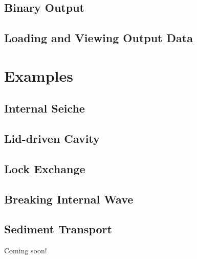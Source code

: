 \documentclass[12pt]{report}
\begin{document}
\section{Binary Output}

\section{Loading and Viewing Output Data}

\chapter{Examples}

\section{Internal Seiche}

\section{Lid-driven Cavity}

\section{Lock Exchange}

\section{Breaking Internal Wave}

\section{Sediment Transport}
Coming soon!



\end{document}
